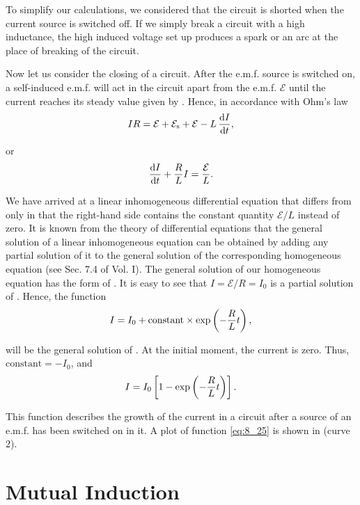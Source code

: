 To simplify our calculations, we considered that the circuit is shorted when the current source is switched off.
If we simply break a circuit with a high inductance, the high induced voltage set up produces a spark or an arc at the place of breaking of the circuit.

Now let us consider the closing of a circuit.
After the e.m.f. source is switched on, a self-induced e.m.f. will act in the circuit apart from the e.m.f. $\mathcal{E}$ until the current reaches its steady value given by .
Hence, in accordance with Ohm's law
\begin{equation*}
	IR = \mathcal{E} + \mathcal{E}_{\text{s}} + \mathcal{E} - L\, \dfrac{\mathrm{d} I}{\mathrm{d} t},
\end{equation*}

\noindent
or
\begin{equation}\label{eq:8_24}
	\dfrac{\mathrm{d} I}{\mathrm{d} t} + \frac{R}{L} I = \frac{\mathcal{E}}{L}.
\end{equation}

We have arrived at a linear inhomogeneous differential equation that differs from  only in that the right-hand side contains the constant quantity $\mathcal{E}/L$ instead of zero.
It is known from the theory of differential equations that the general solution of a linear inhomogeneous equation can be obtained by adding any partial solution of it to the general solution of the corresponding homogeneous equation (see Sec. 7.4 of Vol. I).
The general solution of our homogeneous equation has the form of .
It is easy to see that $I=\mathcal{E}/R=I_0$ is a partial solution of .
Hence, the function
\begin{equation*}
	I = I_0 + \text{constant} \times \exp\left(- \frac{R}{L} t\right),
\end{equation*}

\noindent
will be the general solution of .
At the initial moment, the current is zero.
Thus, $\text{constant}=-I_0$, and
\begin{equation}\label{eq:8_25}
	I = I_0 \left[1 - \exp\left( -\frac{R}{L} t\right)\right].
\end{equation}

\noindent
This function describes the growth of the current in a circuit after a source of an e.m.f. has been switched on in it.
A plot of function \eqref{eq:8_25} is shown in  (curve $2$).

\section{Mutual Induction}\label{sec:8_7}

